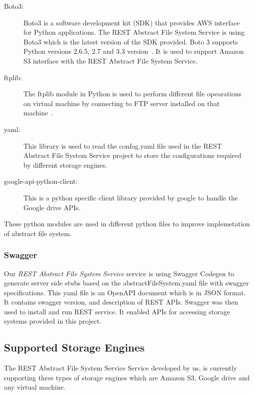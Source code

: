 \begin{description}

\item[Boto3:] Boto3 is a software development kit (SDK) that provides
  AWS interface for Python applications. The REST Abstract File System
  Service is using Boto3 which is the latest version of the SDK
  provided. Boto 3 supports Python versions 2.6.5, 2.7 and 3.3
  version~\cite{hid-sp18-420-boto}.  It is used to support Amazon S3
  interface with the REST Abstract File System Service.

\item[ftplib:] The ftplib module in Python is used to perform
  different file opearations on virtual machine by connecting to FTP
  server installed on that machine~\cite{hid-sp18-420-FTP}.

\item[yaml:] This library is used to read the confog.yaml file used in
  the REST Abstract File System Service project to store the
  configurations required by different storage engines.

\item[google-api-python-client:] This is a python specific client
  library provided by google to handle the Google drive APIs.

\end{description}

These python modules are used in different python files to improve 
implemetation of abstract file system.

\subsubsection{Swagger}

Our \emph{REST Abstract File System Service} service is using Swagger Codegen
to generate server side stubs based on the abstractFileSystem.yaml
file with swagger specifications.  This yaml file is an OpenAPI
document which is in JSON format.  It contains swagger version, and
description of REST APIs.  Swagger was then used to install and run
REST service. It enabled APIs for accessing storage systems provided
in this project.

\subsection{Supported Storage Engines}

The REST Abstract File System Service Service developed by us, is currently
supporting three types of storage engines which are Amazon S3, Google
drive and any virtual machine. 

